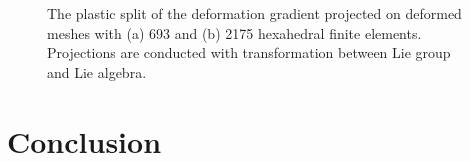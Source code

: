 \documentclass[12pt]{article}
\begin{document}
\begin{figure}[htbp]
  \begin{center}
    \unitlength=1.0mm
    \caption{The plastic split of the deformation gradient projected
      on deformed meshes with (a) 693 and (b) 2175 hexahedral finite
      elements. Projections are conducted with transformation between
      Lie group and Lie algebra.}
    \label{fig:BilletWLie}
  \end{center}
\end{figure}

\section{Conclusion}



\end{document}
